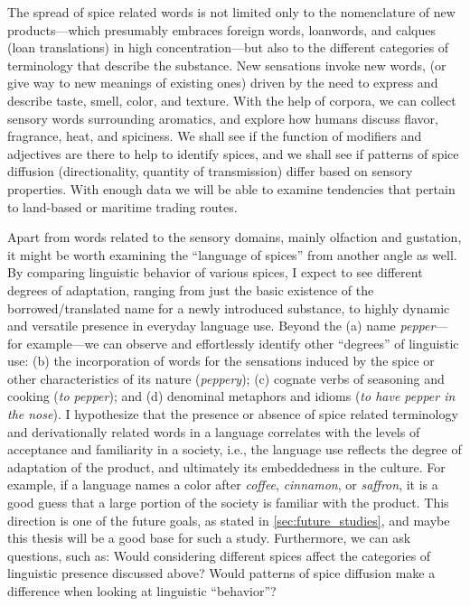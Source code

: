 The spread of spice related words is not limited only to the nomenclature of new products---which presumably embraces foreign words, loanwords, and calques (loan translations) in high concentration---but also to the different categories of terminology that describe the substance. New sensations invoke new words, (or give way to new meanings of existing ones) driven by the need to express and describe taste, smell, color, and texture. With the help of corpora, we can collect sensory words surrounding aromatics, and explore how humans discuss flavor, fragrance, heat, and spiciness. We shall see if the function of modifiers and adjectives are there to help to identify spices, and we shall see if patterns of spice diffusion (directionality, quantity of transmission) differ based on sensory properties. With enough data we will be able to examine tendencies that pertain to land-based or maritime trading routes.

Apart from words related to the sensory domains, mainly olfaction and gustation, it might be worth examining the ``language of spices'' from another angle as well. By comparing linguistic behavior of various spices, I expect to see different degrees of adaptation, ranging from just the basic existence of the borrowed/translated name for a newly introduced substance, to highly dynamic and versatile presence in everyday language use. Beyond the (a) name \textit{pepper}---for example---we can observe and effortlessly identify other ``degrees'' of linguistic use: (b) the incorporation of words for the sensations induced by the spice or other characteristics of its nature (\textit{peppery}); (c) cognate verbs of seasoning and cooking (\textit{to pepper}); and (d) denominal metaphors and idioms (\textit{to have pepper in the nose}). I hypothesize that the presence or absence of spice related terminology and derivationally related words in a language correlates with the levels of acceptance and familiarity in a society, i.e., the language use reflects the degree of adaptation of the product, and ultimately its embeddedness in the culture. For example, if a language names a color after \textit{coffee}, \textit{cinnamon}, or \textit{saffron}, it is a good guess that a large portion of the society is familiar with the product. This direction is one of the future goals, as stated in \cref{sec:future_studies}, and maybe this thesis will be a good base for such a study. Furthermore, we can ask questions, such as: Would considering different spices affect the categories of linguistic presence discussed above? Would patterns of spice diffusion make a difference when looking at linguistic ``behavior''?

